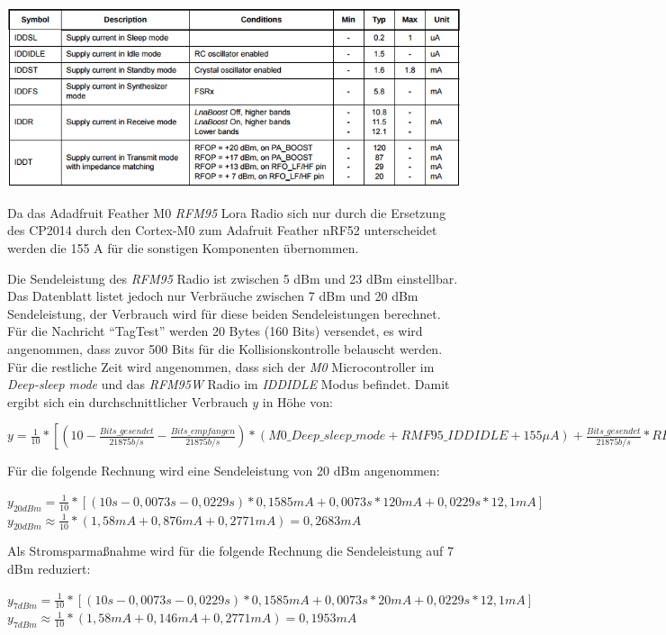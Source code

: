 \begin{table}[h]
  \centering
  \caption{Stromverbrauch des \emph{RFM95}, aus \cite{hope2006rfm}}
	\includegraphics[width=\textwidth]{images/lorapower.png}
  \label{table:lorapower}
\end{table}

Da das Adadfruit Feather M0 \emph{RFM95} Lora Radio sich nur durch die Ersetzung des CP2014 durch den Cortex-M0 zum Adafruit Feather nRF52 unterscheidet werden die 155 \textmu A für die sonstigen Komponenten übernommen.

Die Sendeleistung des \emph{RFM95} Radio ist zwischen 5 dBm und 23 dBm einstellbar. 
Das Datenblatt listet jedoch nur Verbräuche zwischen 7 dBm und 20 dBm Sendeleistung, der Verbrauch wird für diese beiden Sendeleistungen berechnet.
Für die Nachricht "`TagTest"' werden 20 Bytes (160 Bits) versendet, es wird angenommen, dass zuvor 500 Bits für die Kollisionskontrolle belauscht werden.
Für die restliche Zeit wird angenommen, dass sich der \emph{M0} Microcontroller im \emph{Deep-sleep mode} und das \emph{RFM95W} Radio im \emph{IDDIDLE} Modus befindet.
Damit ergibt sich ein durchschnittlicher Verbrauch $y$ in Höhe von: 

$y = \frac{1}{10} * [(10 - \frac{Bits\_gesendet}{21875 b/s} - \frac{Bits\_empfangen}{21875 b/s}) * (M0\_Deep\_sleep\_mode + RMF95\_IDDIDLE + 155 {\mu}A) + \frac{Bits\_gesendet}{21875 b/s} * RFM95\_XdBm + \frac{Bits\_empfangen}{21875 b/s} * RFM95\_IDDR]$

Für die folgende Rechnung wird eine Sendeleistung von 20 dBm angenommen:

$y_{20dBm} = \frac{1}{10} * [(10s - 0,0073s - 0,0229s) * 0,1585mA + 0,0073s * 120mA + 0,0229s * 12,1mA]$\\[0.5cm]
$y_{20dBm} \approx \frac{1}{10} * (1,58mA + 0,876mA + 0,2771mA) = 0,2683mA$

Als Stromsparmaßnahme wird für die folgende Rechnung die Sendeleistung auf 7 dBm reduziert:

$y_{7dBm} = \frac{1}{10} * [(10s - 0,0073s - 0,0229s) * 0,1585mA + 0,0073s * 20mA + 0,0229s * 12,1mA]$\\[0.5cm]
$y_{7dBm} \approx \frac{1}{10} * (1,58mA + 0,146mA + 0,2771mA) = 0,1953mA$


